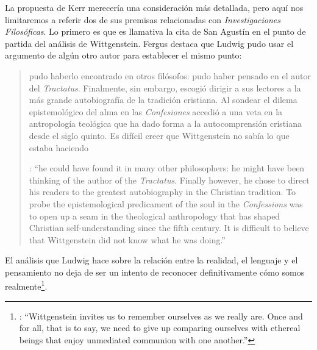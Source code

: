La propuesta de Kerr merecería una consideración más detallada, pero aquí nos limitaremos a referir dos de sus premisas relacionadas con \emph{Investigaciones Filosóficas}. Lo primero es que es llamativa la cita de San Agustín en el punto de partida del análisis de Wittgenstein. Fergus destaca que Ludwig pudo usar el argumento de algún otro autor para establecer el mismo punto: \blockquote[{\cite[42]{kerr1997theo}}: \enquote{he could have found it in many other philosophers: he might have been thinking of the author of the \emph{Tractatus}. Finally however, he chose to direct his readers to the greatest autobiography in the Christian tradition. To probe the epistemological predicament of the soul in the \emph{Confessions} was to open up a seam in the theological anthropology that has shaped Christian self-understanding since the fifth century. It is difficult to believe that Wittgenstein did not know what he was doing.}]{pudo haberlo encontrado en otros filósofos: pudo haber pensado en el autor del \emph{Tractatus}. Finalmente, sin embargo, escogió dirigir a sus lectores a la más grande autobiografía de la tradición cristiana. Al sondear el dilema epistemológico del alma en las \emph{Confesiones} accedió a una veta en la antropología teológica que ha dado forma a la autocomprensión cristiana desde el siglo quinto. Es difícil creer que Wittgenstein no sabía lo que estaba haciendo}. El análisis que Ludwig hace sobre la relación entre la realidad, el lenguaje y el pensamiento no deja de ser un intento de reconocer definitivamente cómo somos realmente\footnote{\cite[Cf.~][23]{kerr1997theo}: \enquote{Wittgenstein invites us to remember ourselves as we really are. Once and for all, that is to say, we need to give up comparing ourselves with ethereal beings that enjoy unmediated communion with one another.}}.

